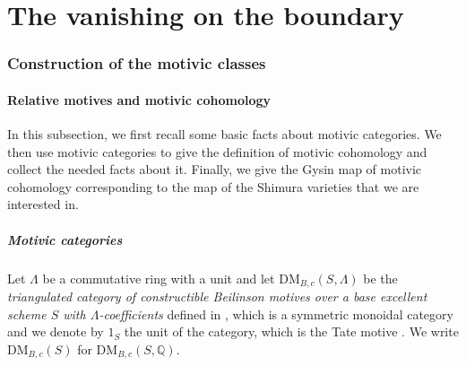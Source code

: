 \documentclass[11pt, a4paper]{amsart}
\theoremstyle{plain}
\theoremstyle{definition}
\numberwithin{equation}{section}
\def\QQ{\mathbb{Q}}
\begin{document}

\clearpage 

\part{The vanishing on the boundary}

\section{Construction of the motivic classes}
\label{Sec: construction of motivic class}
\subsection{Relative motives and motivic cohomology} 
\label{SS: relative motive} 

In this subsection, we first recall some basic facts about motivic categories. We then use motivic categories to give the definition of motivic cohomology and collect the needed facts about it. Finally, we give the Gysin map of motivic cohomology corresponding to the map of the Shimura varieties that we are interested in. 

\subsubsection{Motivic categories}
Let $\Lambda$ be a commutative ring with a unit and let $\mathrm{DM}_{B,c}(S, \Lambda)$ be the \textit{triangulated category of constructible Beilinson motives over a base excellent scheme $S$ with $\Lambda$-coefficients} defined in \cite[Def.15.1.1]{Cisinski_Deglise}, which is a symmetric monoidal category and we denote by $1_{S}$ the unit of the category, which is the Tate motive \cite[Introduction B, page xxi]{Cisinski_Deglise}. We write $\mathrm{DM}_{B,c}(S)$ for $\mathrm{DM}_{B,c}(S, \QQ)$. 
\end{document}
